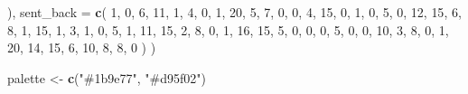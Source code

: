 \documentclass[
]{article}
\newenvironment{Shaded}{\begin{snugshade}}{\end{snugshade}}
\newcommand{\AttributeTok}[1]{\textcolor[rgb]{0.13,0.29,0.53}{#1}}
\newcommand{\DecValTok}[1]{\textcolor[rgb]{0.00,0.00,0.81}{#1}}
\newcommand{\FunctionTok}[1]{\textcolor[rgb]{0.13,0.29,0.53}{\textbf{#1}}}
\newcommand{\NormalTok}[1]{#1}
\newcommand{\OtherTok}[1]{\textcolor[rgb]{0.56,0.35,0.01}{#1}}
\newcommand{\StringTok}[1]{\textcolor[rgb]{0.31,0.60,0.02}{#1}}
\begin{document}
\begin{Shaded}
\begin{Highlighting}[]
\NormalTok{    ),}
    \AttributeTok{sent\_back =} \FunctionTok{c}\NormalTok{(}
        \DecValTok{1}\NormalTok{, }\DecValTok{0}\NormalTok{, }\DecValTok{6}\NormalTok{, }\DecValTok{11}\NormalTok{, }\DecValTok{1}\NormalTok{, }\DecValTok{4}\NormalTok{, }\DecValTok{0}\NormalTok{, }\DecValTok{1}\NormalTok{, }\DecValTok{20}\NormalTok{, }\DecValTok{5}\NormalTok{, }\DecValTok{7}\NormalTok{, }\DecValTok{0}\NormalTok{, }\DecValTok{0}\NormalTok{, }\DecValTok{4}\NormalTok{, }\DecValTok{15}\NormalTok{, }\DecValTok{0}\NormalTok{, }\DecValTok{1}\NormalTok{, }\DecValTok{0}\NormalTok{, }\DecValTok{5}\NormalTok{, }\DecValTok{0}\NormalTok{, }\DecValTok{12}\NormalTok{, }\DecValTok{15}\NormalTok{, }\DecValTok{6}\NormalTok{, }\DecValTok{8}\NormalTok{, }\DecValTok{1}\NormalTok{, }\DecValTok{15}\NormalTok{, }\DecValTok{1}\NormalTok{, }\DecValTok{3}\NormalTok{, }\DecValTok{1}\NormalTok{, }\DecValTok{0}\NormalTok{, }\DecValTok{5}\NormalTok{, }\DecValTok{1}\NormalTok{,}
        \DecValTok{11}\NormalTok{, }\DecValTok{15}\NormalTok{, }\DecValTok{2}\NormalTok{, }\DecValTok{8}\NormalTok{, }\DecValTok{0}\NormalTok{, }\DecValTok{1}\NormalTok{, }\DecValTok{16}\NormalTok{, }\DecValTok{15}\NormalTok{, }\DecValTok{5}\NormalTok{, }\DecValTok{0}\NormalTok{, }\DecValTok{0}\NormalTok{, }\DecValTok{0}\NormalTok{, }\DecValTok{5}\NormalTok{, }\DecValTok{0}\NormalTok{, }\DecValTok{0}\NormalTok{, }\DecValTok{10}\NormalTok{, }\DecValTok{3}\NormalTok{, }\DecValTok{8}\NormalTok{, }\DecValTok{0}\NormalTok{, }\DecValTok{1}\NormalTok{, }\DecValTok{20}\NormalTok{, }\DecValTok{14}\NormalTok{, }\DecValTok{15}\NormalTok{, }\DecValTok{6}\NormalTok{, }\DecValTok{10}\NormalTok{, }\DecValTok{8}\NormalTok{, }\DecValTok{8}\NormalTok{, }\DecValTok{0}
\NormalTok{    )}
\NormalTok{)}

\NormalTok{palette }\OtherTok{\textless{}{-}} \FunctionTok{c}\NormalTok{(}\StringTok{"\#1b9e77"}\NormalTok{, }\StringTok{"\#d95f02"}\NormalTok{)}


\end{Highlighting}
\end{Shaded}
\end{document}
